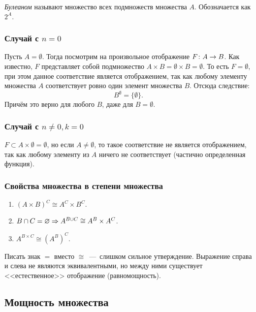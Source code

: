 \begin{definition}
	\textit{Булеаном} называют множество всех подмножеств множества $A$. Обозначается как $2^A$.
\end{definition}

\subsubsection*{Случай с $n = 0$}

Пусть $A = \emptyset$. Тогда посмотрим на произвольное отображение $F \colon A \rightarrow B$. Как известно, $F$ представляет собой подмножество $A \times B = \emptyset \times B = \emptyset$. То есть $F = \emptyset$, при этом данное соответствие является отображением, так как любому элементу множества $A$ соответствует ровно один элемент множества $B$. Отсюда следствие:
$$
	B^{\emptyset} = \{\emptyset\}.
$$
Причём это верно для любого $B$, даже для $B = \emptyset$.

\subsubsection*{Случай с $n \neq 0, k = 0$}

$F \subset A \times \emptyset = \emptyset$, но если $A \neq \emptyset$, то такое соответствие не является отображением, так как любому элементу из $A$ ничего не соответствует (частично определенная функция).

\subsubsection*{Свойства множества в степени множества}

\begin{enumerate}
	\item $(A \times B)^C \cong A^C \times B^C$.
	\item $B \cap C = \varnothing \Rightarrow A^{B \cup C} \cong A^B \times A^C$.
	\item $A^{B \times C} \cong (A^B)^C$.
\end{enumerate}

\begin{note}
	Писать знак $=$ вместо $\cong$~---~слишком сильное утверждение. Выражение справа и слева не являются эквивалентными, но между ними существует <<естественное>> отображение (равномощность).
\end{note}

\subsection{Мощность множества}

